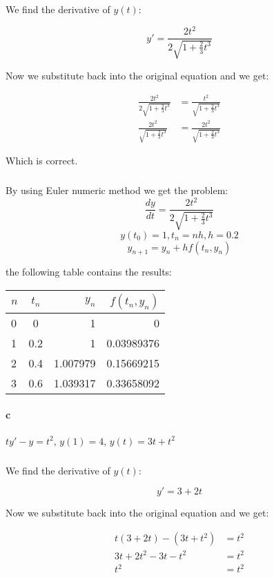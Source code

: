 \documentclass{article}
\begin{document}
\subparagraph{} We find the derivative of $y(t)$:

\[
    y' = \frac{2t^2}{2\sqrt{1+\frac{2}{3}t^{3}}}
\]

Now we substitute back into the original equation and we get:

\begin{align*}
    \frac{2t^2}{2\sqrt{1+\frac{2}{3}t^{3}}} &= \frac{t^2}{\sqrt{1 + \frac{2}{3}t^{3}}}\\
    \frac{2t^2}{ \sqrt{1+\frac{2}{3}t^{3}}}&= \frac{2t^2}{\sqrt{1 + \frac{2}{3}t^{3}}}
\end{align*}

Which is correct.

\subparagraph{} By using Euler numeric method we get the problem:
\[
    \frac{dy}{dt} = \frac{2t^2}{2\sqrt{1+\frac{2}{3}t^{3}}}
\]
\[
    y(t_0) = 1, t_n = nh, h = 0.2
\]
\[
    y_{n+1} = y_n + hf(t_n,y_n)
\]

the following table contains the results:

\begin{table}[ht]
  \begin{center}
    \label{tab:1.b}
    \begin{tabular}{l|c|r|r} %
      $n$&$t_n$&$y_n$&$f(t_n,y_n)$\\
      \hline
        0&0&1&0\\
        1&0.2&1&0.03989376\\
        2&0.4&1.007979&0.15669215\\
        3&0.6&1.039317&0.33658092\\
    \end{tabular}
  \end{center}
\end{table}

\newpage

\paragraph{c} $ty' - y = t^{2}$, $y(1)=4$, $y(t)=3t + t^{2}$

\subparagraph{} We find the derivative of $y(t)$:

\[
    y' = 3 + 2t
\]

Now we substitute back into the original equation and we get:

\begin{align*}
    t(3 + 2t) - (3t + t^{2}) &= t^{2}\\
    3t + 2t^{2} - 3t - t^{2} &= t^{2}\\
    t^{2} &= t^{2}
\end{align*}
\end{document}
